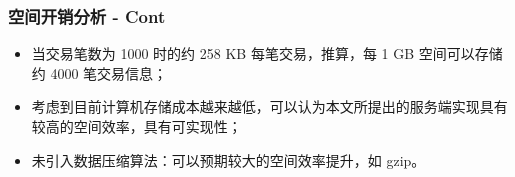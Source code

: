 \begin{frame}
    \frametitle{空间开销分析 - Cont}

    \begin{itemize}
        \item 当交易笔数为 1000 时的约 258 KB 每笔交易，推算，每 1 GB 空间可以存储约 4000 笔交易信息；
        \item 考虑到目前计算机存储成本越来越低，可以认为本文所提出的服务端实现具有较高的空间效率，具有可实现性；
        \item 未引入数据压缩算法：可以预期较大的空间效率提升，如 gzip。
    \end{itemize}

\end{frame}
